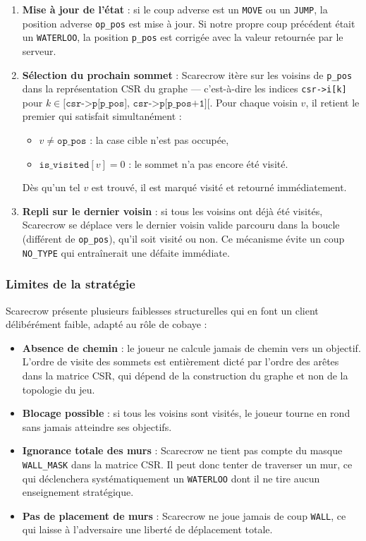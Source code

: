 \documentclass[12pt,a4paper]{article}
\begin{document}
\begin{enumerate}
    \item \textbf{Mise à jour de l'état} : si le coup adverse est un
    \texttt{MOVE} ou un \texttt{JUMP}, la position adverse \texttt{op\_pos}
    est mise à jour. Si notre propre coup précédent était un \texttt{WATERLOO},
    la position \texttt{p\_pos} est corrigée avec la valeur retournée par le
    serveur.

    \item \textbf{Sélection du prochain sommet} : Scarecrow itère sur les
    voisins de \texttt{p\_pos} dans la représentation CSR du graphe — c'est-à-dire
    les indices \texttt{csr->i[k]} pour $k \in [\texttt{csr->p[p\_pos]},\,
    \texttt{csr->p[p\_pos+1]}[$. Pour chaque voisin $v$, il retient
    le premier qui satisfait simultanément :
    \begin{itemize}
        \item $v \neq \texttt{op\_pos}$ : la case cible n'est pas occupée,
        \item $\texttt{is\_visited}[v] = 0$ : le sommet n'a pas encore été visité.
    \end{itemize}
    Dès qu'un tel $v$ est trouvé, il est marqué visité et retourné immédiatement.

    \item \textbf{Repli sur le dernier voisin} : si tous les voisins ont
    déjà été visités, Scarecrow se déplace vers le dernier voisin valide
    parcouru dans la boucle (différent de \texttt{op\_pos}), qu'il soit
    visité ou non. Ce mécanisme évite un coup \texttt{NO\_TYPE} qui
    entraînerait une défaite immédiate.
\end{enumerate}


\subsubsection{Limites de la stratégie}

Scarecrow présente plusieurs faiblesses structurelles qui en font un client
délibérément faible, adapté au rôle de cobaye :

\begin{itemize}
    \item \textbf{Absence de chemin} : le joueur ne calcule jamais de
    chemin vers un objectif. L'ordre de visite des sommets est entièrement
    dicté par l'ordre des arêtes dans la matrice CSR, qui dépend de la
    construction du graphe et non de la topologie du jeu.
    \item \textbf{Blocage possible} : si tous les voisins sont visités, le joueur tourne en rond sans jamais atteindre ses
    objectifs.
    \item \textbf{Ignorance totale des murs} : Scarecrow ne tient pas compte
    du masque \texttt{WALL\_MASK} dans la matrice CSR. Il peut donc tenter
    de traverser un mur, ce qui déclenchera systématiquement un \texttt{WATERLOO}
    dont il ne tire aucun enseignement stratégique.
    \item \textbf{Pas de placement de murs} : Scarecrow ne joue jamais de
    coup \texttt{WALL}, ce qui laisse à l'adversaire une liberté de déplacement
    totale.
\end{itemize}
\end{document}
